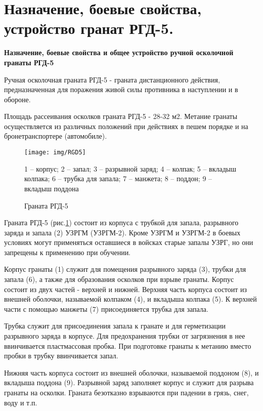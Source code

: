 \documentclass[12pt,a4paper]{report}
\begin{document}
\section{Назначение, боевые свойства, устройство гранат РГД-5.}
\textbf{Назначение, боевые свойства и общее устройство ручной осколочной гранаты РГД-5}

Ручная осколочная граната РГД-5 - граната дистанционного действия, предназначенная для поражения живой силы противника в наступлении и в обороне.

Площадь рассеивания осколков граната РГД-5 - 28-32 м2. Метание гранаты осуществляется из различных положений при действиях в пешем порядке и на бронетранспортере (автомобиле).

\begin{figure}[h]
\centering
\texttt{[image: img/RGD5]}
\caption{Граната РГД-5}
1 – корпус; 2 – запал; 3 – разрывной заряд; 4 – колпак; 5 – вкладыш колпака; 6 – трубка для запала; 7 – манжета; 8 – поддон; 9 – вкладыш поддона
\label{fig:RGD5}
\end{figure}

Граната РГД-5 (рис.\ref{fig:RGD5}) состоит из корпуса с трубкой для запала, разрывного заряда и запала (2) УЗРГМ (УЗРГМ-2). Кроме УЗРГМ и УЗРГМ-2 в боевых условиях могут применяться оставшиеся в войсках старые запалы УЗРГ, но они запрещены к применению при обучении.

Корпус гранаты (1) служит для помещения разрывного заряда (3), трубки для запала (6), а также для образования осколков при взрыве гранаты. Корпус состоит из двух частей - верхней и нижней. Верхняя часть корпуса состоит из внешней оболочки, называемой колпаком (4), и вкладыша колпака (5). К верхней части с помощью манжеты (7) присоединяется трубка для запала.

Трубка служит для присоединения запала к гранате и для герметизации разрывного заряда в корпусе.
Для предохранения трубки от загрязнения в нее ввинчивается пластмассовая пробка. При подготовке гранаты к метанию вместо пробки в трубку ввинчивается запал. 

Нижняя часть корпуса состоит из внешней оболочки, называемой поддоном (8), и вкладыша поддона (9). Разрывной заряд заполняет корпус и служит для разрыва гранаты на осколки.
Граната безотказно взрываются при падении в грязь, снег, воду и т.п.
\end{document}
